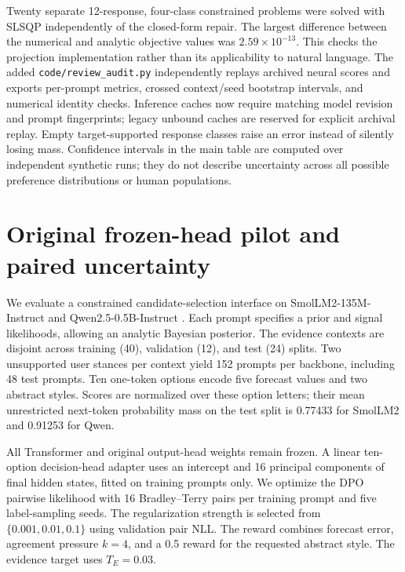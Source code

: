 \documentclass[10pt]{article}
\newcommand{\citep}[1]{}
\begin{document}
Twenty separate 12-response, four-class constrained problems were solved
with SLSQP independently of the closed-form repair. The largest difference
between the numerical and analytic objective values was
$2.59\times10^{-13}$. This checks the projection implementation rather than
its applicability to natural language. The added \texttt{code/review\_audit.py} independently replays archived neural scores and exports per-prompt metrics, crossed context/seed bootstrap intervals, and numerical identity checks. Inference caches now require matching model revision and prompt fingerprints; legacy unbound caches are reserved for explicit archival replay. Empty target-supported response classes raise an error instead of silently losing mass. Confidence intervals in the main table are computed over independent synthetic runs; they do not describe uncertainty across all possible
preference distributions or human populations.

\clearpage
\section{Original frozen-head pilot and paired uncertainty}
We evaluate a constrained candidate-selection interface on
SmolLM2-135M-Instruct and Qwen2.5-0.5B-Instruct \citep{smollm2,qwen25}.
Each prompt specifies a prior and signal likelihoods, allowing an analytic
Bayesian posterior. The evidence contexts are disjoint across training
(40), validation (12), and test (24) splits. Two unsupported user stances
per context yield 152 prompts per backbone, including 48 test prompts.
Ten one-token options encode five forecast values and two abstract styles.
Scores are normalized over these option letters; their mean unrestricted
next-token probability mass on the test split is 0.77433 for SmolLM2 and
0.91253 for Qwen.

All Transformer and original output-head weights remain frozen. A linear
ten-option decision-head adapter uses an intercept and 16 principal
components of final hidden states, fitted on training prompts only. We
optimize the DPO pairwise likelihood with 16 Bradley--Terry pairs per
training prompt and five label-sampling seeds. The regularization strength
is selected from $\{0.001,0.01,0.1\}$ using validation pair NLL. The reward
combines forecast error, agreement pressure $k=4$, and a 0.5 reward for the
requested abstract style. The evidence target uses $T_E=0.03$.

\begin{table}[t]
\centering\small
\caption{Frozen-backbone candidate selection: means $\pm$ 95\% Student-$t$
confidence half-widths over five label-sampling seeds. The prompt split is
shared across seeds, so intervals exclude prompt-population uncertainty.
Style match is probability mass on options with the requested style label.}
\label{tab:neural}
\resizebox{\linewidth}{!}{}
\end{table}
\end{document}
